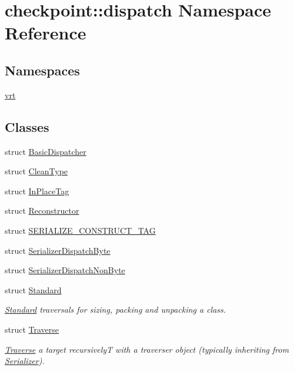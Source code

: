 \hypertarget{namespacecheckpoint_1_1dispatch}{}\section{checkpoint\+:\+:dispatch Namespace Reference}
\label{namespacecheckpoint_1_1dispatch}
\subsection*{Namespaces}
\begin{DoxyCompactItemize}
\item 
 \hyperlink{namespacecheckpoint_1_1dispatch_1_1vrt}{vrt}
\end{DoxyCompactItemize}
\subsection*{Classes}
\begin{DoxyCompactItemize}
\item 
struct \hyperlink{structcheckpoint_1_1dispatch_1_1_basic_dispatcher}{Basic\+Dispatcher}
\item 
struct \hyperlink{structcheckpoint_1_1dispatch_1_1_clean_type}{Clean\+Type}
\item 
struct \hyperlink{structcheckpoint_1_1dispatch_1_1_in_place_tag}{In\+Place\+Tag}
\item 
struct \hyperlink{structcheckpoint_1_1dispatch_1_1_reconstructor}{Reconstructor}
\item 
struct \hyperlink{structcheckpoint_1_1dispatch_1_1_s_e_r_i_a_l_i_z_e___c_o_n_s_t_r_u_c_t___t_a_g}{S\+E\+R\+I\+A\+L\+I\+Z\+E\+\_\+\+C\+O\+N\+S\+T\+R\+U\+C\+T\+\_\+\+T\+AG}
\item 
struct \hyperlink{structcheckpoint_1_1dispatch_1_1_serializer_dispatch_byte}{Serializer\+Dispatch\+Byte}
\item 
struct \hyperlink{structcheckpoint_1_1dispatch_1_1_serializer_dispatch_non_byte}{Serializer\+Dispatch\+Non\+Byte}
\item 
struct \hyperlink{structcheckpoint_1_1dispatch_1_1_standard}{Standard}
\begin{DoxyCompactList}\small\item\em \hyperlink{structcheckpoint_1_1dispatch_1_1_standard}{Standard} traversals for sizing, packing and unpacking a class. \end{DoxyCompactList}\item 
struct \hyperlink{structcheckpoint_1_1dispatch_1_1_traverse}{Traverse}
\begin{DoxyCompactList}\small\item\em \hyperlink{structcheckpoint_1_1dispatch_1_1_traverse}{Traverse} a target recursively{\ttfamily T} with a traverser object (typically inheriting from {\ttfamily \hyperlink{structcheckpoint_1_1_serializer}{Serializer}}). \end{DoxyCompactList}\end{DoxyCompactItemize}
